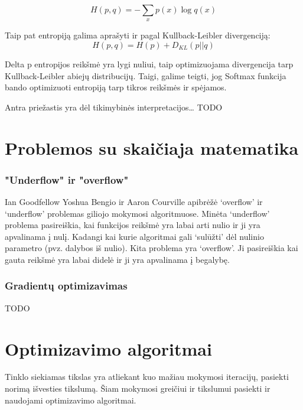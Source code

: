 \documentclass{VUMIFInfKursinis}
\begin{document}
\[
H(p, q) = - \sum_{x}p(x) \log q(x)
\]

\par
Taip pat entropiją galima aprašyti ir pagal Kullback-Leibler divergenciją:
\[
H(p, q) = H(p) + D_{KL}(p || q)
\]
\par
Delta p entropijos reikšmė yra lygi nuliui, taip optimizuojama divergencija tarp
Kullback-Leibler abiejų distribucijų. Taigi, galime teigti, jog Softmax funkcija
bando optimizuoti entropiją tarp tikros reikšmės ir spėjamos.
\par
Antra priežastis yra dėl tikimybinės interpretacijos…
TODO

\section{Problemos su skaičiaja matematika}
\subsubsection{"Underflow" ir "overflow"}
\par
Ian Goodfellow Yoshua Bengio ir Aaron Courville apibrėžė ‘overflow’ ir ‘underflow’
problemas giliojo mokymosi algoritmuose. Minėta ‘underflow’ problema pasireiškia,
kai funkcijos reikšmė yra labai arti nulio ir ji yra apvalinama į nulį. Kadangi kai
kurie algoritmai gali ‘sulūžti’ dėl nulinio parametro (pvz. dalybos iš nulio). Kita
problema yra ‘overflow’. Ji pasireiškia kai gauta reikšmė yra labai didelė ir ji yra
apvalinama į begalybę.

\subsubsection{Gradientų optimizavimas}
TODO

\section{Optimizavimo algoritmai}
\par
Tinklo siekiamas tikslas yra atliekant kuo mažiau mokymosi iteracijų, pasiekti norimą
išvesties tikslumą. Šiam mokymosi greičiui ir tikslumui pasiekti ir naudojami
optimizavimo algoritmai.
\end{document}
